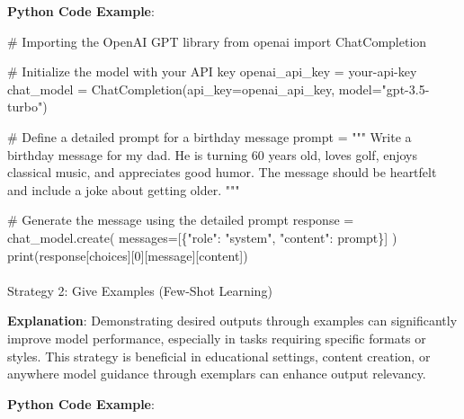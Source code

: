 \documentclass[
]{agujournal2019}
\makeatletter
\let\oldparagraph\paragraph
\renewcommand{\paragraph}{
    \@ifstar
      \xxxParagraphStar
      \xxxParagraphNoStar
  }
\newcommand{\xxxParagraphStar}[1]{\oldparagraph*{#1}\mbox{}}
\newcommand{\xxxParagraphNoStar}[1]{\oldparagraph{#1}\mbox{}}
\newenvironment{Shaded}{\begin{snugshade}}{\end{snugshade}}
\newcommand{\BuiltInTok}[1]{\textcolor[rgb]{0.00,0.23,0.31}{#1}}
\newcommand{\CommentTok}[1]{\textcolor[rgb]{0.37,0.37,0.37}{#1}}
\newcommand{\DecValTok}[1]{\textcolor[rgb]{0.68,0.00,0.00}{#1}}
\newcommand{\ImportTok}[1]{\textcolor[rgb]{0.00,0.46,0.62}{#1}}
\newcommand{\NormalTok}[1]{\textcolor[rgb]{0.00,0.23,0.31}{#1}}
\newcommand{\OperatorTok}[1]{\textcolor[rgb]{0.37,0.37,0.37}{#1}}
\newcommand{\StringTok}[1]{\textcolor[rgb]{0.13,0.47,0.30}{#1}}
\makeatother
\begin{document}
\textbf{Python Code Example}:

\begin{Shaded}
\begin{Highlighting}[]
\CommentTok{\# Importing the OpenAI GPT library}
\ImportTok{from}\NormalTok{ openai }\ImportTok{import}\NormalTok{ ChatCompletion}

\CommentTok{\# Initialize the model with your API key}
\NormalTok{openai\_api\_key }\OperatorTok{=} \StringTok{\textquotesingle{}your{-}api{-}key\textquotesingle{}}
\NormalTok{chat\_model }\OperatorTok{=}\NormalTok{ ChatCompletion(api\_key}\OperatorTok{=}\NormalTok{openai\_api\_key, model}\OperatorTok{=}\StringTok{"gpt{-}3.5{-}turbo"}\NormalTok{)}

\CommentTok{\# Define a detailed prompt for a birthday message}
\NormalTok{prompt }\OperatorTok{=} \StringTok{"""}
\StringTok{Write a birthday message for my dad. He is turning 60 years old, loves golf, enjoys classical music, and appreciates good humor. The message should be heartfelt and include a joke about getting older.}
\StringTok{"""}

\CommentTok{\# Generate the message using the detailed prompt}
\NormalTok{response }\OperatorTok{=}\NormalTok{ chat\_model.create(}
\NormalTok{    messages}\OperatorTok{=}\NormalTok{[\{}\StringTok{"role"}\NormalTok{: }\StringTok{"system"}\NormalTok{, }\StringTok{"content"}\NormalTok{: prompt\}]}
\NormalTok{)}
\BuiltInTok{print}\NormalTok{(response[}\StringTok{\textquotesingle{}choices\textquotesingle{}}\NormalTok{][}\DecValTok{0}\NormalTok{][}\StringTok{\textquotesingle{}message\textquotesingle{}}\NormalTok{][}\StringTok{\textquotesingle{}content\textquotesingle{}}\NormalTok{])}
\end{Highlighting}
\end{Shaded}

\paragraph{Strategy 2: Give Examples (Few-Shot
Learning)}\label{strategy-2-give-examples-few-shot-learning}

\textbf{Explanation}: Demonstrating desired outputs through examples can
significantly improve model performance, especially in tasks requiring
specific formats or styles. This strategy is beneficial in educational
settings, content creation, or anywhere model guidance through exemplars
can enhance output relevancy.

\textbf{Python Code Example}:
\end{document}
